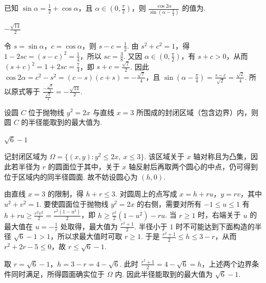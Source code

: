 \begin{problem}
已知 \(\sin \alpha = \frac{1}{2} + \cos \alpha\)，且 \(\alpha \in \left(0, \frac{\pi}{2}\right)\)，则 \(\frac{\cos 2\alpha}{\sin \left(\alpha - \frac{\pi}{4}\right)}\) 的值为\fillinblank{}.
\begin{answer}
\(-\frac{\sqrt{14}}{2}\)
\end{answer}

\begin{solution}
令 \(s=\sin\alpha\)，\(c=\cos\alpha\)，则 \(s-c=\frac{1}{2}\). 由 \(s^2+c^2=1\)，得 \(1-2sc=(s-c)^2=\frac{1}{4}\)，所以 \(sc=\frac{3}{8}\). 又因 \(\alpha\in\left(0,\frac{\pi}{2}\right)\)，有 \(s+c>0\)，从而 \((s+c)^2=1+2sc=\frac{7}{4}\)，即 \(s+c=\frac{\sqrt{7}}{2}\). 因此
\(\cos2\alpha=c^2-s^2=(c-s)(c+s)=-\frac{\sqrt{7}}{4}\)，且 \(\sin\left(\alpha-\frac{\pi}{4}\right)=\frac{s-c}{\sqrt{2}}=\frac{\sqrt{2}}{4}\). 所以原式等于 \(\frac{-\frac{\sqrt{7}}{4}}{\frac{\sqrt{2}}{4}}=-\frac{\sqrt{14}}{2}\).
\end{solution}
\end{problem}

\begin{problem}
设圆 \(C\) 位于抛物线 \(y^{2} = 2x\) 与直线 \(x = 3\) 所围成的封闭区域（包含边界）内，则圆 \(C\) 的半径能取到的最大值为\fillinblank{}.
\begin{answer}
\(\sqrt{6} - 1\)
\end{answer}

\begin{solution}
记封闭区域为 \(\Omega=\{(x,y):y^2\leqslant2x,\ x\leqslant3\}\). 该区域关于 \(x\) 轴对称且为凸集，因此若半径为 \(r\) 的圆面位于其中，关于 \(x\) 轴反射后再取两个圆心的中点，仍可得到位于区域内的同半径圆面. 故不妨设圆心为 \((h,0)\).

由直线 \(x=3\) 的限制，得 \(h+r\leqslant3\). 对圆周上的点写成 \(x=h+ru\)，\(y=rv\)，其中 \(u^2+v^2=1\). 要使圆面位于抛物线 \(y^2=2x\) 的右侧，需要对所有 \(-1\leqslant u\leqslant1\) 有
\(h+ru\geqslant\frac{r^2v^2}{2}=\frac{r^2(1-u^2)}{2}\)，即
\(h\geqslant\frac{r^2}{2}(1-u^2)-ru\). 当 \(r\geqslant1\) 时，右端关于 \(u\) 的最大值在 \(u=-\frac{1}{r}\) 处取得，最大值为 \(\frac{r^2+1}{2}\). 半径小于 \(1\) 时不可能达到下面构造的半径 \(\sqrt{6}-1>1\)，所以求最大值时可取 \(r\geqslant1\). 于是
\(\frac{r^2+1}{2}\leqslant h\leqslant3-r\)，从而 \(r^2+2r-5\leqslant0\)，故 \(r\leqslant\sqrt{6}-1\).

取 \(r=\sqrt{6}-1\)，\(h=3-r=4-\sqrt{6}\). 此时 \(\frac{r^2+1}{2}=4-\sqrt{6}=h\)，上述两个边界条件同时满足，所得圆面确实位于 \(\Omega\) 内. 因此半径能取到的最大值为 \(\sqrt{6}-1\).
\end{solution}
\end{problem}

